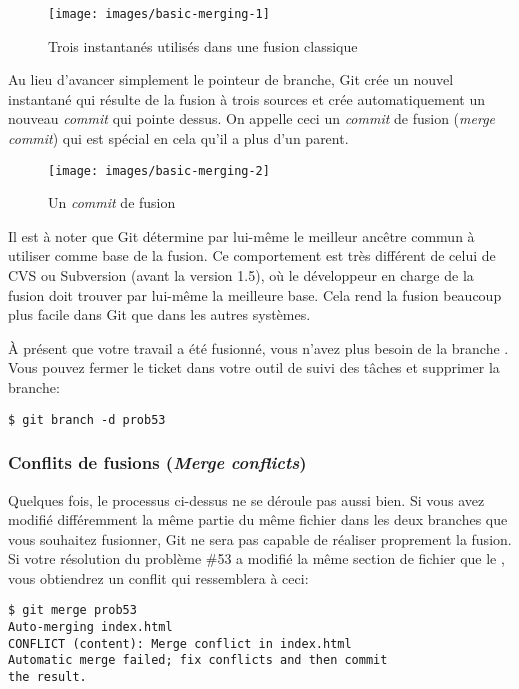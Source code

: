 \begin{figure}[H]
  \centering
  \texttt{[image: images/basic-merging-1]}
  \caption{Trois instantanés utilisés dans une fusion classique}
  \label{fig:git:basic-merging-1}
\end{figure}

Au lieu d'avancer simplement le pointeur de branche, Git crée un nouvel instantané qui résulte de la fusion à trois sources et crée automatiquement un nouveau \emph{commit} qui pointe dessus.
On appelle ceci un \emph{commit} de fusion (\emph{merge commit}) qui est spécial en cela qu'il a plus d'un parent.

\begin{figure}[H]
  \centering
  \texttt{[image: images/basic-merging-2]}
  \caption{Un \emph{commit} de fusion}
  \label{fig:git:basic-merging-2}
\end{figure}

Il est à noter que Git détermine par lui-même le meilleur ancêtre commun à utiliser comme base de la fusion. Ce comportement est très différent de celui de CVS ou Subversion (avant la version 1.5), où le développeur en charge de la fusion doit trouver par lui-même la meilleure base.
Cela rend la fusion beaucoup plus facile dans Git que dans les autres systèmes.

À présent que votre travail a été fusionné, vous n'avez plus besoin de la branche .
Vous pouvez fermer le ticket dans votre outil de suivi des tâches et supprimer la branche:
\begin{Schunk}
\begin{Verbatim}
$ git branch -d prob53
\end{Verbatim}
\end{Schunk}

\subsubsection{Conflits de fusions (\emph{Merge conflicts})}
\label{sec:git:basic_merge_conflicts}

Quelques fois, le processus ci-dessus ne se déroule pas aussi bien.
Si vous avez modifié différemment la même partie du même fichier dans les deux branches que vous souhaitez fusionner, Git ne sera pas capable de réaliser proprement la fusion.
Si votre résolution du problème \#53 a modifié la même section de fichier que le , vous obtiendrez un conflit qui ressemblera à ceci:
\begin{Schunk}
\begin{Verbatim}
$ git merge prob53
Auto-merging index.html
CONFLICT (content): Merge conflict in index.html
Automatic merge failed; fix conflicts and then commit
the result.
\end{Verbatim}
\end{Schunk}

